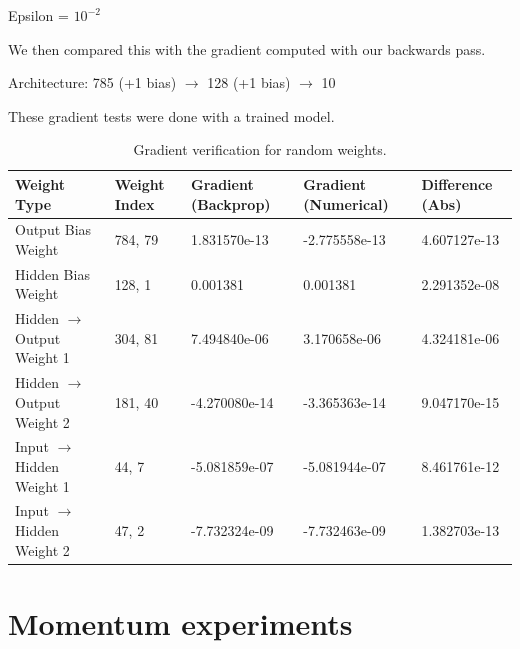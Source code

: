 \documentclass{article}
\begin{document}
Epsilon = $10^{-2}$

We then compared this with the gradient computed with our backwards pass.

Architecture: 785 (+1 bias) $\rightarrow$ 128 (+1 bias) $\rightarrow$ 10 

These gradient tests were done with a trained model.


\begin{table}[hbt!]
\centering
\begin{tabular}{|p{3.8cm}|p{1.3cm}|p{2.1cm}|p{2.01cm}|p{2.1cm}|}
\hline
\textbf{Weight Type} & \textbf{Weight Index} & \textbf{Gradient (Backprop)} & \textbf{Gradient (Numerical)} & \textbf{Difference (Abs)} \\ \hline
Output Bias Weight   &           784, 79           &           1.831570e-13                   &         -2.775558e-13                      &         4.607127e-13             \\ \hline
Hidden Bias Weight   &            128, 1          &         0.001381                     &       0.001381                        &         2.291352e-08             \\ \hline
Hidden $\rightarrow$ Output Weight 1 &    304, 81   &      7.494840e-06                        &          3.170658e-06                     &             4.324181e-06         \\ \hline
Hidden $\rightarrow$ Output Weight 2 &   181, 40    &        -4.270080e-14                      &      -3.365363e-14                         &       9.047170e-15               \\ \hline
Input $\rightarrow$ Hidden Weight 1  &    44, 7   &        -5.081859e-07                       &                -5.081944e-07               &         8.461761e-12             \\ \hline
Input $\rightarrow$ Hidden Weight 2  &    47, 2   &        -7.732324e-09                      &            -7.732463e-09                   &        1.382703e-13              \\ \hline
\end{tabular}
\vspace{0.3cm}
\caption{Gradient verification for random weights.}
\label{tab:gradient_check}
\end{table}

\vspace{1cm}

\section{Momentum experiments}
\end{document}
